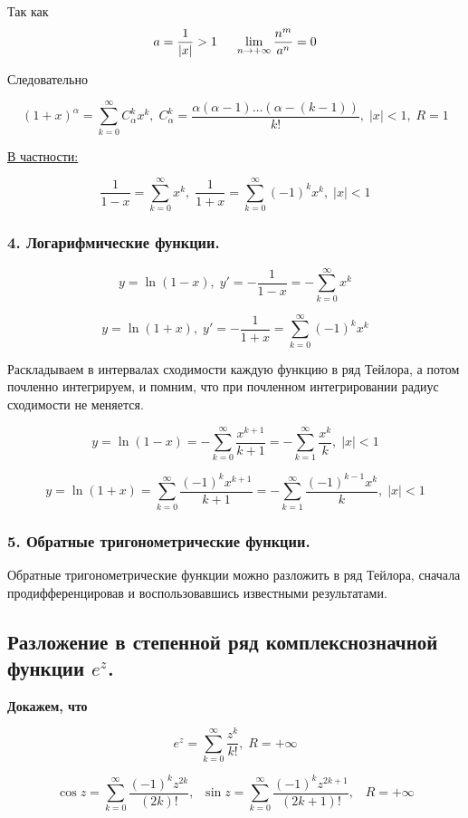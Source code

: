 \documentclass[a4paper,12pt]{article} %
\newcommand{\ryad}{\sum\limits^{\infty}_{k = 0}}
\begin{document}
Так как 
$$
a = \frac{1}{|x|} > 1 \hspace{0.5cm} \lim\limits_{n \rightarrow + \infty} \frac{n^m}{a^n} = 0$$

Следовательно 

$$
(1 + x)^{\alpha} = \ryad C_{\alpha}^k x^k, \; C_{\alpha}^k = \frac{\alpha (\alpha - 1) \ldots (\alpha - (k -1))}{k!}, \; |x| < 1, \; R = 1 
$$

\underline{В частности:}

$$
\frac{1}{1 - x} = \ryad x^k, \; \frac{1}{1 + x} = \ryad (-1)^k x^k, \; |x| < 1
$$

\subsubsection*{4. Логарифмические функции.}



$$
y = \ln(1 - x), \; y' = - \frac{1}{1 - x} = - \ryad x^k
$$

$$
y = \ln(1 + x), \; y' = - \frac{1}{1 + x} = \ryad (-1)^k x^k
$$

Раскладываем в интервалах сходимости каждую функцию в ряд Тейлора, а потом почленно интегрируем, и помним, что при почленном интегрировании радиус сходимости не меняется. 

$$ 
y = \ln(1 - x) = - \ryad \frac{x^{k + 1}}{k + 1} = - \sum\limits^{\infty}_{k = 1} \frac{x^k}{k}, \; |x| < 1
$$

$$
y = \ln(1 + x) = \ryad \frac{(-1)^k x^{k + 1}}{k + 1} = - \sum\limits^{\infty}_{k = 1} \frac{(-1)^{k - 1} x^k}{k}, \; |x| < 1
$$
\subsubsection*{5. Обратные тригонометрические функции.}

Обратные тригонометрические функции можно разложить в ряд Тейлора, сначала продифференцировав и воспользовавшись известными результатами.

\subsection{Разложение в степенной ряд комплекснозначной функции $e^z$.}

\textbf{Докажем, что} 

$$
e^z = \ryad \frac{z^k}{k!}, \; R = + \infty
$$

$$
\cos z = \ryad \frac{(-1)^k z^{2k}}{(2k)!}, \;\; \sin z = \ryad \frac{(-1)^k z^{2k + 1}}{(2k + 1)!}, \;\;\; R = + \infty
$$
\end{document}
